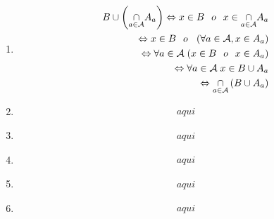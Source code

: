 \documentclass[10pt, a4paper]{article}
\makeatletter
\newenvironment{nlist}
{\begin{enumerate}
    \renewcommand\labelenumi{(\emph{\roman{enumi})}}}
  {\end{enumerate}}
\renewenvironment{proof}[1][\proofname] {\par\pushQED{\qed}\normalfont\topsep6\p@\@plus6\p@\relax\trivlist\item[\hskip\labelsep\itshape\sffamily#1\@addpunct{.}]\ignorespaces}{\popQED\endtrivlist\@endpefalse}
\theoremstyle{theorem-style}
\theoremstyle{definition-style}
\theoremstyle{remark-style}
\theoremstyle{example-style}
\theoremstyle{definition-style}
\theoremstyle{remark-style}
\makeatother
\begin{document}
\begin{proof}
\begin{nlist}
\item
\begin{equation}
\begin{split}
B\cup\left(\underset{a\in\mathcal{A}}{\cap}A_a\right) \Leftrightarrow x\in B\hspace{0.25cm} o \hspace{0.25cm} x\in\underset{a\in\mathcal{A}}{\cap}A_a \\
\Leftrightarrow x\in B\hspace{0.25cm} o \hspace{0.25cm}\left(\forall a\in\mathcal{A}, x\in A_a\right) \\
\Leftrightarrow \forall a\in\mathcal{A}\hspace{0.1cm} (x\in B\hspace{0.25cm}o\hspace{0.25cm}x\in A_a) \\
\Leftrightarrow \forall a\in\mathcal{A}\hspace{0.1cm} x\in B\cup A_a \\
\Leftrightarrow \underset{a\in\mathcal{A}}{\cap}\left(B\cup A_a\right)
\end{split}
\end{equation}
\item
\begin{equation}
\begin{split}
aqui
\end{split}
\end{equation}
\item
\begin{equation}
\begin{split}
aqui
\end{split}
\end{equation}
\item
\begin{equation}
\begin{split}
aqui
\end{split}
\end{equation}
\item
\begin{equation}
\begin{split}
aqui
\end{split}
\end{equation}
\item
\begin{equation}
\begin{split}
aqui
\end{split}
\end{equation}
\end{nlist}
\end{proof}
\end{document}
